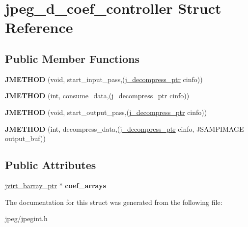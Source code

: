 \hypertarget{structjpeg__d__coef__controller}{}\section{jpeg\+\_\+d\+\_\+coef\+\_\+controller Struct Reference}
\label{structjpeg__d__coef__controller}
\subsection*{Public Member Functions}
\begin{DoxyCompactItemize}
\item 
{\bfseries J\+M\+E\+T\+H\+OD} (void, start\+\_\+input\+\_\+pass,(\hyperlink{structjpeg__decompress__struct}{j\+\_\+decompress\+\_\+ptr} cinfo))\hypertarget{structjpeg__d__coef__controller_ab4b18cfac761c7186363a845e36f342c}{}\label{structjpeg__d__coef__controller_ab4b18cfac761c7186363a845e36f342c}

\item 
{\bfseries J\+M\+E\+T\+H\+OD} (int, consume\+\_\+data,(\hyperlink{structjpeg__decompress__struct}{j\+\_\+decompress\+\_\+ptr} cinfo))\hypertarget{structjpeg__d__coef__controller_a4c0e8d307e0852eae338a0f4f3c96edb}{}\label{structjpeg__d__coef__controller_a4c0e8d307e0852eae338a0f4f3c96edb}

\item 
{\bfseries J\+M\+E\+T\+H\+OD} (void, start\+\_\+output\+\_\+pass,(\hyperlink{structjpeg__decompress__struct}{j\+\_\+decompress\+\_\+ptr} cinfo))\hypertarget{structjpeg__d__coef__controller_addb7a363607be97630bf37175267fd58}{}\label{structjpeg__d__coef__controller_addb7a363607be97630bf37175267fd58}

\item 
{\bfseries J\+M\+E\+T\+H\+OD} (int, decompress\+\_\+data,(\hyperlink{structjpeg__decompress__struct}{j\+\_\+decompress\+\_\+ptr} cinfo, J\+S\+A\+M\+P\+I\+M\+A\+GE output\+\_\+buf))\hypertarget{structjpeg__d__coef__controller_a5d61ba56d9f5d8de0662df091aa6d9e1}{}\label{structjpeg__d__coef__controller_a5d61ba56d9f5d8de0662df091aa6d9e1}

\end{DoxyCompactItemize}
\subsection*{Public Attributes}
\begin{DoxyCompactItemize}
\item 
\hyperlink{structjvirt__barray__control}{jvirt\+\_\+barray\+\_\+ptr} $\ast$ {\bfseries coef\+\_\+arrays}\hypertarget{structjpeg__d__coef__controller_a6611f9e18fbbbb13d117caadb5d14dc1}{}\label{structjpeg__d__coef__controller_a6611f9e18fbbbb13d117caadb5d14dc1}

\end{DoxyCompactItemize}


The documentation for this struct was generated from the following file\+:\begin{DoxyCompactItemize}
\item 
jpeg/jpegint.\+h\end{DoxyCompactItemize}
